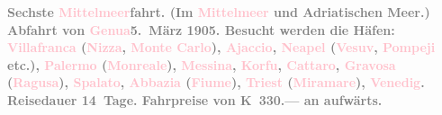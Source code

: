            \textcolor{gray}{\textbf{\textbf{Sechste \textcolor{pink}{Mittelmeer}{}\ledrightnote{\textcolor{pink}{Mittelmeer}}fahrt.}
                  (Im \textcolor{pink}{Mittelmeer}{}\ledrightnote{\textcolor{pink}{Mittelmeer}} und Adriatischen Meer.) Abfahrt
                  von \textcolor{pink}{Genua}{}\ledrightnote{\textcolor{pink}{Genua}}{ }\textbf{5. März 1905}. Besucht werden die Häfen: \textcolor{pink}{Villafranca}{}\ledrightnote{\textcolor{pink}{Villefranche-sur-Mer}}
                     (\textcolor{pink}{Nizza}{}\ledrightnote{\textcolor{pink}{Nizza}}, \textcolor{pink}{Monte
                     Carlo}{}\ledrightnote{\textcolor{pink}{Monte Carlo}}), \textcolor{pink}{Ajaccio}{}\ledrightnote{\textcolor{pink}{Ajaccio}}, \textcolor{pink}{Neapel}{}\ledrightnote{\textcolor{pink}{Neapel}} (\textcolor{pink}{Vesuv}{}\ledrightnote{\textcolor{pink}{Vesuv}}, \textcolor{pink}{Pompeji}{}\ledrightnote{\textcolor{pink}{Pompei}} etc.), \textcolor{pink}{Palermo}{}\ledrightnote{\textcolor{pink}{Palermo}} (\textcolor{pink}{Monreale}{}\ledrightnote{\textcolor{pink}{Monreale}}), \textcolor{pink}{Messina}{}\ledrightnote{\textcolor{pink}{Messina}}, \textcolor{pink}{Korfu}{}\ledrightnote{\textcolor{pink}{Korfu}}, \textcolor{pink}{Cattaro}{}\ledrightnote{\textcolor{pink}{Kotor}}, \textcolor{pink}{Gravosa}{}\ledrightnote{\textcolor{pink}{Dubrovnik}} (\textcolor{pink}{Ragusa}{}\ledrightnote{\textcolor{pink}{Dubrovnik}}), \textcolor{pink}{Spalato}{}\ledrightnote{\textcolor{pink}{Split}}, \textcolor{pink}{Abbazia}{}\ledrightnote{\textcolor{pink}{Opatija}} (\textcolor{pink}{Fiume}{}\ledrightnote{\textcolor{pink}{Rijeka}}), \textcolor{pink}{Triest}{}\ledrightnote{\textcolor{pink}{Triest}}
                     (\textcolor{pink}{Miramare}{}\ledrightnote{\textcolor{pink}{Schloss Miramare}}), \textcolor{pink}{Venedig}{}\ledrightnote{\textcolor{pink}{Venedig}}. Reisedauer 14 Tage. Fahrpreise von \textbf{K 330.—}
                  an aufwärts.}}\pend
           \pstart
